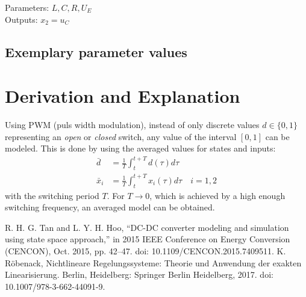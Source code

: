 \documentclass[10pt,a4paper]{article}
\begin{document}
	\noindent
	Parameters: $L, C, R, U_E$ %
	\\
	Outputs: $x_2 = u_C$
	
	
	
	
	\subsection{Exemplary parameter values}
	

	
	\section{Derivation and Explanation} %
	Using PWM (puls width modulation), instead of only discrete values $d\in\{0,1\}$ representing an \textit{open} or \textit{closed} switch, 
	any value of the interval $[0,1]$ can be modeled. This is done by using the averaged values for states and inputs:
	\begin{align*}
		\bar{d} &= \frac{1}{T}\int_t^{t+T} d(\tau)d\tau \\
		\bar{x}_i &= \frac{1}{T}\int_t^{t+T} x_i(\tau)d\tau \quad i=1,2
	\end{align*}
	with the switching period $T$. For $T\rightarrow 0$, which is achieved by a high enough switching frequency, an averaged model can be obtained.
	
	
	\begin{thebibliography}{10}		
		R. H. G. Tan and L. Y. H. Hoo, “DC-DC converter modeling and simulation using state space approach,” in 2015 IEEE Conference on Energy Conversion (CENCON), Oct. 2015, pp. 42–47. doi: 10.1109/CENCON.2015.7409511.
		K. Röbenack, Nichtlineare Regelungssysteme: Theorie und Anwendung der exakten Linearisierung. Berlin, Heidelberg: Springer Berlin Heidelberg, 2017. doi: 10.1007/978-3-662-44091-9.
	\end{thebibliography}
\end{document}

